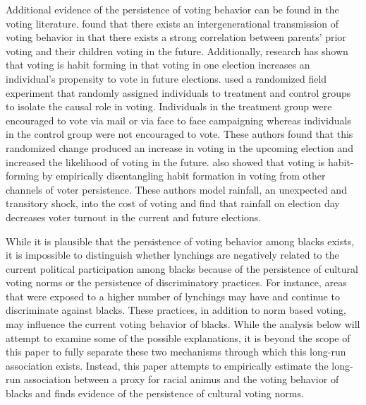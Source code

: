 \documentclass[AEJ, finalmode]{AEA}
\begin{document}
Additional evidence of the persistence of voting behavior can be found in the voting literature.  found that there exists an intergenerational transmission of voting behavior in that there exists a strong correlation between parents' prior voting and their children voting in the future. Additionally, research has shown that voting is habit forming in that voting in one election increases an individual's propensity to vote in future elections.  used a randomized field experiment that randomly assigned individuals to treatment and control groups to isolate the causal role in voting. Individuals in the treatment group were encouraged to vote via mail or via face to face campaigning whereas individuals in the control group were not encouraged to vote. These authors found that this randomized change produced an increase in voting in the upcoming election and increased the likelihood of voting in the future.  also showed that voting is habit-forming by empirically disentangling habit formation in voting from other channels of voter persistence. These authors model rainfall, an unexpected and transitory shock, into the cost of voting and find that rainfall on election day decreases voter turnout in the current and future elections. 

While it is plausible that the persistence of voting behavior among blacks exists, it is impossible to distinguish whether lynchings are negatively related to the current political participation among blacks because of the persistence of cultural voting norms or the persistence of discriminatory practices. For instance, areas that were exposed to a higher number of lynchings may have and continue to discriminate against blacks. These practices, in addition to norm based voting, may influence the current voting behavior of blacks. While the analysis below will attempt to examine some of the possible explanations, it is beyond the scope of this paper to fully separate these two mechanisms through which this long-run association exists. Instead, this paper attempts to empirically estimate the long-run association between a proxy for racial animus and the voting behavior of blacks and finds evidence of the persistence of cultural voting norms. 
\end{document}
